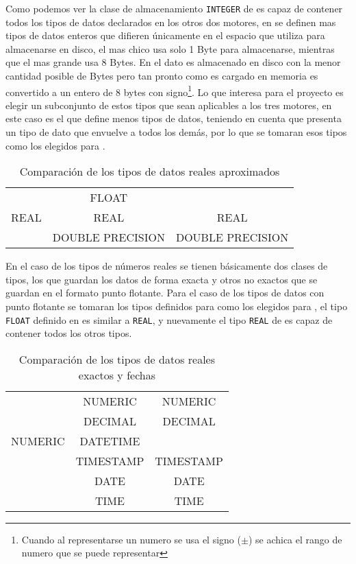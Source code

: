 %
Como podemos ver la clase de almacenamiento \verb=INTEGER= de \s es capaz de contener todos los tipos de datos declarados en los otros dos motores, en \m se definen mas tipos de datos enteros que  difieren únicamente en el espacio que utiliza para almacenarse en disco, el mas chico usa  solo 1 Byte para almacenarse, mientras que el mas grande usa 8 Bytes. En \s el dato es almacenado en disco con la menor cantidad posible de Bytes pero tan pronto como es cargado en memoria es convertido a un entero de 8 bytes con signo\footnote{Cuando al representarse un numero se usa el signo ($\pm$) se achica el rango de numero que se puede representar}. Lo que  interesa para el proyecto es elegir un subconjunto de estos tipos que sean aplicables a los tres motores, en este caso es \p el que define menos tipos de datos, teniendo en cuenta que \s presenta un tipo de dato que envuelve a todos los demás, por lo que se tomaran esos tipos como los elegidos para \jj.
%
\begin{table}[h]
\begin{center}
\begin{tabular}{|c|c|c|}
\hline \s   & \m               & \p \\  
\hline      & FLOAT            &  \\ 
       REAL & REAL             & REAL \\
            & DOUBLE PRECISION & DOUBLE PRECISION \\
\hline 
\end{tabular} 
\end{center}
\caption{Comparación de los tipos de datos reales aproximados}
\end{table}
%

En el caso de los tipos de números reales se tienen básicamente dos clases de tipos, los que guardan los datos de forma exacta y otros no exactos que se guardan en el formato punto flotante. Para el caso de los tipos de datos con punto flotante se tomaran los tipos definidos para \p como los elegidos para \jj, el tipo \verb=FLOAT= definido en \m es similar a \verb=REAL=, y nuevamente el tipo \verb=REAL= de \s es capaz de contener todos los otros tipos. 
%
\begin{table}[h]
\begin{center}
\begin{tabular}{|c|c|c|}
\hline \s & \m & \p \\  
\hline  & NUMERIC & NUMERIC \\
  & DECIMAL & DECIMAL \\
NUMERIC  & DATETIME &  \\
  & TIMESTAMP & TIMESTAMP \\
  & DATE & DATE \\
  & TIME & TIME \\  
\hline 
\end{tabular} 
\end{center}
\caption{Comparación de los tipos de datos reales exactos y fechas}
\end{table}
%

